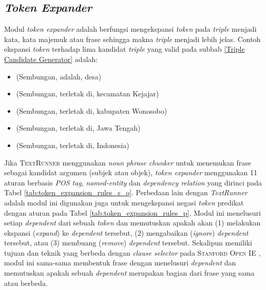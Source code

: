 \subsection{\textit{Token Expander}}

Modul \textit{token expander} adalah berfungsi mengekspansi \textit{token} pada \textit{triple} menjadi kata, kata majemuk atau frase sehingga makna \textit{triple} menjadi lebih jelas. Contoh ekspansi \textit{token} terhadap lima kandidat \textit{triple} yang valid pada subbab \ref{Triple Candidate Generator} adalah:

\begin{itemize}
\item (Sembungan, adalah, desa)
\item (Sembungan, terletak di, kecamatan Kejajar)
\item (Sembungan, terletak di, kabupaten Wonosobo)
\item (Sembungan, terletak di, Jawa Tengah)
\item (Sembungan, terletak di, Indonesia)
\end{itemize}

Jika \textsc{TextRunner} menggunakan \textit{noun phrase chunker} \citep{banko2007open} untuk menemukan frase sebagai kandidat argumen (subjek atau objek), \textit{token expander} menggunakan 11 aturan berbasis \textit{POS tag}, \textit{named-entity} dan \textit{dependency relation} yang dirinci pada Tabel \ref{tab:token_expansion_rules_s_o}. Perbedaan lain dengan \textit{TextRunner} adalah modul ini digunakan juga untuk mengekspansi negasi \textit{token} predikat dengan aturan pada Tabel \ref{tab:token_expansion_rules_p}. Modul ini menelusuri setiap \textit{dependent} dari sebuah \textit{token} dan memutuskan apakah akan (1) melakukan ekspansi (\textit{expand}) ke \textit{dependent} tersebut, (2) mengabaikan (\textit{ignore}) \textit{dependent} tersebut, atau (3) membuang (\textit{remove}) \textit{dependent} tersebut. Sekalipun memiliki tujuan dan teknik yang berbeda dengan \textit{clause selector} pada \textsc{Stanford Open IE} \citep{angeli2015leveraging}, modul ini sama-sama membentuk frase dengan menelusuri \textit{dependent} dan memutuskan apakah sebuah \textit{dependent} merupakan bagian dari frase yang sama atau berbeda.


